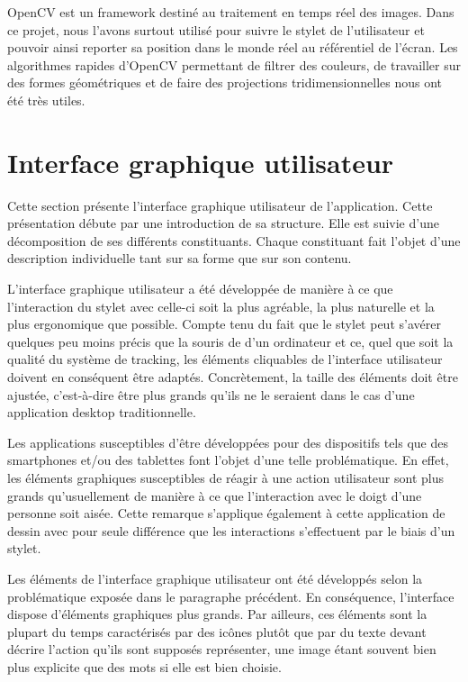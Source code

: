 \documentclass[11pt,a4paper,oldfontcommands]{memoir}
\begin{document}
OpenCV est un framework destiné au traitement en temps réel des images. Dans ce projet, nous l'avons surtout utilisé pour suivre le stylet de l'utilisateur et pouvoir ainsi reporter sa position dans le monde réel au référentiel de l'écran. Les algorithmes rapides d'OpenCV permettant de filtrer des couleurs, de travailler sur des formes géométriques et de faire des projections tridimensionnelles nous ont été très utiles.

\newpage

\section{Interface graphique utilisateur}

Cette section présente l'interface graphique utilisateur de l'application. Cette présentation débute par une introduction de sa structure. Elle est suivie d'une décomposition de ses différents constituants. Chaque constituant fait l'objet d'une description individuelle tant sur sa forme que sur son contenu.

L'interface graphique utilisateur a été développée de manière à ce que l'interaction du stylet avec celle-ci soit la plus agréable, la plus naturelle et la plus ergonomique que possible. Compte tenu du fait que le stylet peut s'avérer quelques peu moins précis que la souris de d'un ordinateur et ce, quel que soit la qualité du système de tracking, les éléments cliquables de l'interface utilisateur doivent en conséquent être adaptés. Concrètement, la taille des éléments doit être ajustée, c'est-à-dire être plus grands qu'ils ne le seraient dans le cas d'une application desktop traditionnelle.

Les applications susceptibles d'être développées pour des dispositifs tels que des smartphones et/ou des tablettes font l'objet d'une telle problématique. En effet, les éléments graphiques susceptibles de réagir à une action utilisateur sont plus grands qu'usuellement de manière à ce que l'interaction avec le doigt d'une personne soit aisée. Cette remarque s'applique également à cette application de dessin avec pour seule différence que les interactions s'effectuent par le biais d'un stylet.

Les éléments de l'interface graphique utilisateur ont été développés selon la problématique exposée dans le paragraphe précédent. En conséquence, l'interface dispose d'éléments graphiques plus grands. Par ailleurs, ces éléments sont la plupart du temps caractérisés par des icônes plutôt que par du texte devant décrire l'action qu'ils sont supposés représenter, une image étant souvent bien plus explicite que des mots si elle est bien choisie.
\end{document}
